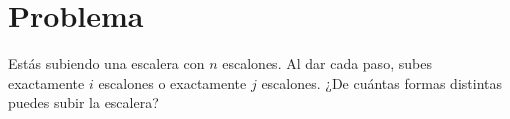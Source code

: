 \section{Problema}
Estás subiendo una escalera con $n$ escalones. Al dar cada paso, subes exactamente $i$ escalones o exactamente $j$ escalones. ¿De cuántas formas distintas puedes subir la escalera?
